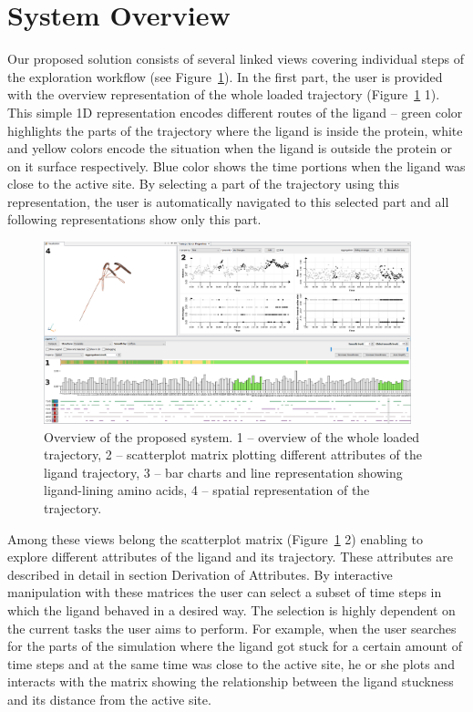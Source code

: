 \documentclass[twocolumn]{bmcart}%
\begin{document}
\section*{System Overview}
Our proposed solution consists of several linked views covering individual steps of the exploration workflow (see Figure~\ref{fig:overview}). 
In the first part, the user is provided with the overview representation of the whole loaded trajectory (Figure~\ref{fig:overview} 1). 
This simple 1D representation encodes different routes of the ligand -- green color highlights the parts of the trajectory where the ligand is inside the protein, white and yellow colors encode the situation when the ligand is outside the protein or on it surface respectively.
Blue color shows the time portions when the ligand was close to the active site.
By selecting a part of the trajectory using this representation, the user is automatically navigated to this selected part and all following representations show only this part.

\begin{figure}[thb]
	\centering
  \includegraphics[width=0.95\textwidth]{img/overview.png}
  \caption{\label{fig:overview} Overview of the proposed system. 1 -- overview of the whole loaded trajectory, 2 -- scatterplot matrix plotting different attributes of the ligand trajectory, 3 -- bar charts and line representation showing ligand-lining amino acids, 4 -- spatial representation of the trajectory.}
\end{figure}

Among these views belong the scatterplot matrix (Figure~\ref{fig:overview} 2) enabling to explore different attributes of the ligand and its trajectory.
These attributes are described in detail in section Derivation of Attributes.
By interactive manipulation with these matrices the user can select a subset of time steps in which the ligand behaved in a desired way.
The selection is highly dependent on the current tasks the user aims to perform.
For example, when the user searches for the parts of the simulation where the ligand got stuck for a certain amount of time steps and at the same time was close to the active site, he or she plots and interacts with the matrix showing the relationship between the ligand stuckness and its distance from the active site.
\end{document}

